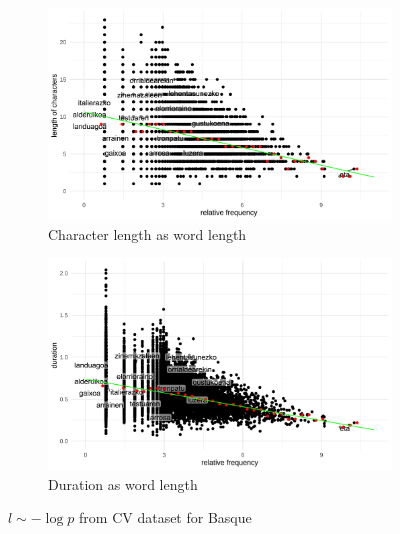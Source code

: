 \begin{figure}[H]
  \centering
  \begin{subfigure}[b]{0.48\textwidth}
    \centering
    \includegraphics[width=\textwidth]{plots/Basque_logp_cl_CV.pdf}
    \caption{Character length as word length}
  \end{subfigure}
  \hfill
  \begin{subfigure}[b]{0.48\textwidth}
    \centering
    \includegraphics[width=\textwidth]{plots/Basque_logp_d_CV.pdf}
    \caption{Duration as word length}
  \end{subfigure}
  \caption{$l \sim -\log p$ from CV dataset for Basque}
\end{figure}
